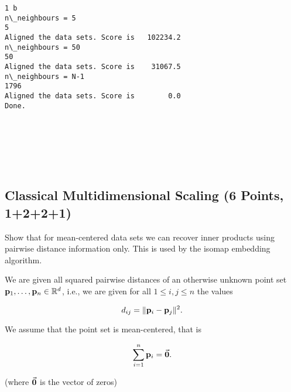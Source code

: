 \documentclass[11pt]{article}
\begin{document}
    \begin{Verbatim}[commandchars=\\\{\}]
1 b
n\_neighbours = 5
5
Aligned the data sets. Score is   102234.2  
n\_neighbours = 50
50
Aligned the data sets. Score is    31067.5  
n\_neighbours = N-1
1796
Aligned the data sets. Score is        0.0  
Done.

    \end{Verbatim}

    \begin{center}
    \end{center}
    { \hspace*{\fill} \\}
    
    \begin{center}
    \end{center}
    { \hspace*{\fill} \\}
    
    \begin{center}
    \end{center}
    { \hspace*{\fill} \\}
    
    \hypertarget{classical-multidimensional-scaling-6-points-1221}{%
\subsection{Classical Multidimensional Scaling (6 Points,
1+2+2+1)}\label{classical-multidimensional-scaling-6-points-1221}}

Show that for mean-centered data sets we can recover inner products
using pairwise distance information only. This is used by the isomap
embedding algorithm.

We are given all squared pairwise distances of an otherwise unknown
point set \({\bf p}_1,\dots, {\bf p}_n \in \mathbb{R}^d\), i.e., we are
given for all \(1 \leq i,j \leq n\) the values

\[  d_{ij} = \|{\bf p}_i - {\bf p}_j\|^2. \]

We assume that the point set is mean-centered, that is

\[ \sum_{i=1}^{n} {\bf p}_i = \vec{{\bf 0}}.\]

(where \(\vec{{\bf 0}}\) is the vector of zeros)
\end{document}
